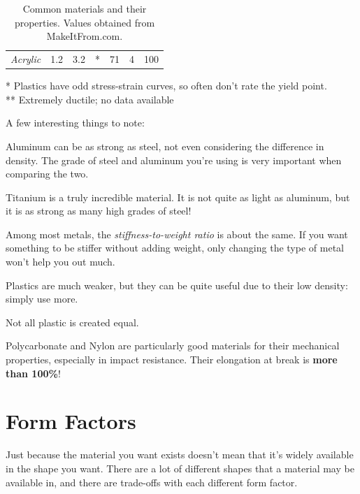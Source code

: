 \documentclass[10pt,letterpaper]{book}
\begin{document}
\begin{table}[H]
\begin{tabular}{rrrrrrr}
\textit{Acrylic}                                                                        & 1.2                                                                                                          & 3.2                                                                                           & *                                                                                      & 71                                                                                   & 4                                                                                           & 100                                                                                          
\end{tabular}
* Plastics have odd stress-strain curves, so often don't rate the yield point. \\
** Extremely ductile; no data available
\caption{Common materials and their properties. Values obtained from MakeItFrom.com.}
\end{table}

A few interesting things to note:
\begin{asparaenum}[a)]
	\item Aluminum can be as strong as steel, not even considering the difference in density. The grade of steel and aluminum you're using is very important when comparing the two.
	\item Titanium is a truly incredible material. It is not quite as light as aluminum, but it is as strong as many high grades of steel!
	\item Among most metals, the \textit{stiffness-to-weight ratio} is about the same. If you want something to be stiffer without adding weight, only changing the type of metal won't help you out much.
	\item Plastics are much weaker, but they can be quite useful due to their low density: simply use more.
	\item Not all plastic is created equal.
	\item Polycarbonate and Nylon are particularly good materials for their mechanical properties, especially in impact resistance. Their elongation at break is \textbf{more than 100\%}!
\end{asparaenum}

 \section{Form Factors}
 
 Just because the material you want exists doesn't mean that it's widely available in the shape you want. There are a lot of different shapes that a material may be available in, and there are trade-offs with each different form factor.
 
\end{document}
